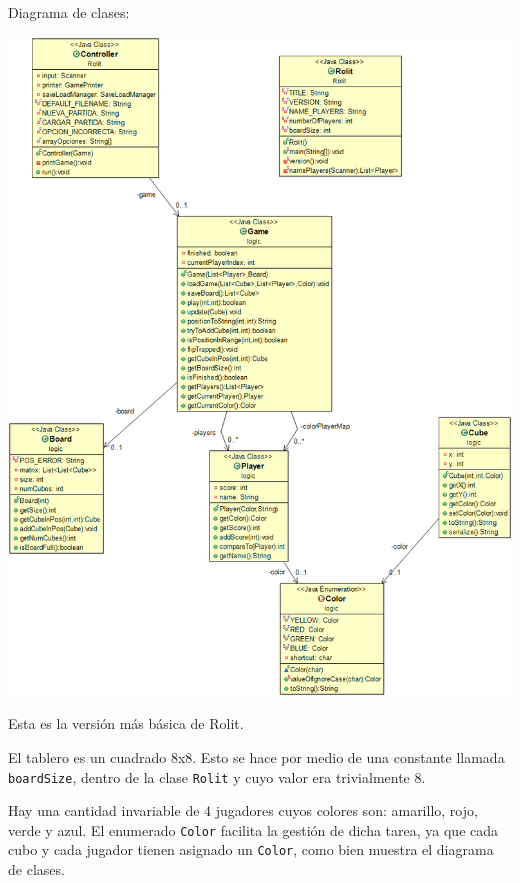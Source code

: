 \documentclass[../DocumentoOficial.tex]{subfiles}
\begin{document}
\begin{sprint}[1]
Diagrama de clases:
\begin{center}
\includegraphics[scale=0.30]{logicS1.png}
\end{center}
Esta es la versión más básica de Rolit.

El tablero es un cuadrado 8x8. Esto se hace por medio de una constante llamada \texttt{boardSize}, dentro de la clase \texttt{Rolit} y cuyo valor era trivialmente 8. 

Hay una cantidad invariable de 4 jugadores cuyos colores son: amarillo, rojo, verde y azul. El enumerado \texttt{Color} facilita la gestión de dicha tarea, ya que cada cubo y cada jugador tienen asignado un \texttt{Color}, como bien muestra el diagrama de clases. 


\end{sprint}
\end{document}
